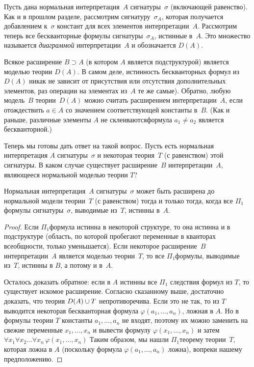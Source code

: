 Пусть дана нормальная интерпретация~$A$ сигнатуры~$\sigma$
(включающей равенство). Как и в прошлом разделе, рассмотрим
сигнатуру~$\sigma_A$, которая получается добавлением к~$\sigma$
констант для всех элементов интерпретации~$A$. Рассмотрим теперь
все бескванторные формулы сигнатуры~$\sigma_A$, истинные в~$A$.
Это множество называется \emph{диаграммой}%
%
интерпретации~$A$ и
обозначается $D(A)$.

Всякое расширение $B\supset A$ (в котором $A$ является
подструктурой) является моделью теории $D(A)$. В самом деле,
истинность бескванторных формул из $D(A)$ никак не зависит от
присутствия или отсутствия дополнительных элементов, раз
операции на элементах из~$A$ те же самые). Обратно, любую
модель~$B$ теории~$D(A)$ можно считать расширением
интерпретации~$A$, если отождествить $a\in A$ со значением
соответствующей константы в~$B$. (Как и раньше, различные
элементы $A$ не склеиваются\т формула $a_1\ne a_2$ является
бескванторной.)

Теперь мы готовы дать ответ на такой вопрос. Пусть есть
нормальная интерпретация $A$ сигнатуры~$\sigma$ и некоторая
теория~$T$ (с равенством) этой сигнатуры. В каком случае
существует расширение~$B$ интерпретации~$A$, являющееся
нормальной моделью теории $T$?

\begin{theorem}
        \label{extension-criterion}%
Нормальная интерпретация~$A$ сигнатуры~$\sigma$ может быть
расширена до нормальной модели теории~$T$ (с равенством) тогда и
только тогда, когда все $\Pi_1$\д формулы сигнатуры~$\sigma$,
выводимые из~$T$, истинны в~$A$.%
\end{theorem}

\begin{proof}
Если $\Pi_1$\д формула истинна в некоторой структуре, то она
истинна и в подструктуре (область, по которой пробегают
переменные в кванторах всеобщности, только уменьшается). Если
некоторое расширение~$B$ интерпретации~$A$ является моделью
теории~$T$, то все $\Pi_1$\д формулы, выводимые из~$T$, истинны
в $B$, а потому и в~$A$.

Осталось доказать обратное: если в $A$ истинны все $\Pi_1$\д
следствия формул из $T$, то существует искомое расширение.
Согласно сказанному выше, достаточно доказать, что теория
$D(A) \hm\cup T$ непротиворечива. Если это не так, то из
$T$ выводится некоторая бескванторная формула
$\varphi(a_1,\dots,a_n)$, ложная в $A$. Но в формулы теории $T$
константы $a_1,\dots,a_n$ не входят, поэтому их можно заменить
на свежие переменные $x_1,\dots,x_n$ и вывести формулу
$\varphi(x_1,\dots,x_n)$ и затем $\forall x_1\forall
x_2\ldots\forall x_n\, \varphi(x_1,\dots,x_n)$ Таким образом, мы
нашли $\Pi_1$\д теорему теории~$T$, которая ложна в $A$
(поскольку формула $\varphi(a_1,\dots,a_n)$ ложна), вопреки нашему
предположению.
\end{proof}

